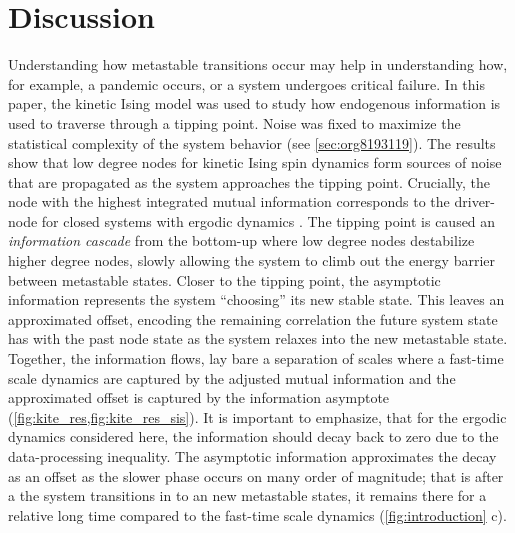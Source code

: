 \documentclass[a4paper, 11pt, twocolumn]{article}
\begin{document}


\section{Discussion}
\label{sec:org389dbab}
Understanding how  metastable transitions occur may  help in
understanding  how, for  example,  a pandemic  occurs, or  a
system  undergoes  critical  failure.  In  this  paper,  the
kinetic  Ising  model  was  used  to  study  how  endogenous
information  is used  to traverse  through a  tipping point.
Noise was  fixed to  maximize the statistical  complexity of
the system behavior (see \ref{sec:org8193119}). The results
show that low  degree nodes for kinetic  Ising spin dynamics
form  sources of  noise that  are propagated  as the  system
approaches the  tipping point. Crucially, the  node with the
highest  integrated mutual  information  corresponds to  the
driver-node  for   closed  systems  with   ergodic  dynamics
\cite{vanElteren2022}.   The  tipping   point  is   caused  an
\emph{information cascade}  from the  bottom-up where  low degree
nodes destabilize  higher degree nodes, slowly  allowing the
system to  climb out  the energy barrier  between metastable
states.  Closer   to  the  tipping  point,   the  asymptotic
information represents the system  ``choosing'' its new stable
state.  This leaves  an  approximated  offset, encoding  the
remaining correlation  the future system state  has with the
past  node  state  as  the   system  relaxes  into  the  new
metastable state. Together, the  information flows, lay bare
a separation of scales where  a fast-time scale dynamics are
captured  by   the  adjusted  mutual  information   and  the
approximated offset is captured by the information asymptote
(\cref{fig:kite_res,fig:kite_res_sis}).   It   is
important  to  emphasize,  that  for  the  ergodic  dynamics
considered here,  the information should decay  back to zero
due  to  the   data-processing  inequality.  The  asymptotic
information  approximates  the decay  as  an  offset as  the
slower  phase occurs  on many  order of  magnitude; that  is
after  a the  system  transitions in  to  an new  metastable
states, it remains  there for a relative  long time compared
to the  fast-time scale dynamics  (\cref{fig:introduction}
c).
\end{document}
